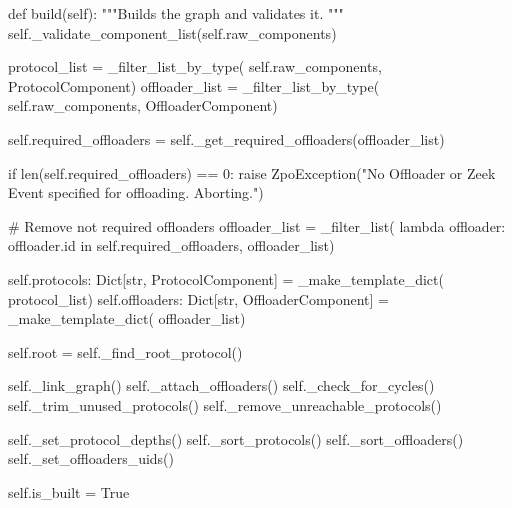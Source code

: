     def build(self):
        """Builds the graph and validates it.
        """
        self._validate_component_list(self.raw_components)

        protocol_list = _filter_list_by_type(
            self.raw_components, ProtocolComponent)
        offloader_list = _filter_list_by_type(
            self.raw_components, OffloaderComponent)

        self.required_offloaders = self._get_required_offloaders(offloader_list)

        if len(self.required_offloaders) == 0:
            raise ZpoException("No Offloader or Zeek Event specified for offloading. Aborting.")

        # Remove not required offloaders
        offloader_list = _filter_list(
            lambda offloader: offloader.id in self.required_offloaders, offloader_list)

        self.protocols: Dict[str, ProtocolComponent] = _make_template_dict(
            protocol_list)
        self.offloaders: Dict[str, OffloaderComponent] = _make_template_dict(
            offloader_list)

        self.root = self._find_root_protocol()

        self._link_graph()
        self._attach_offloaders()
        self._check_for_cycles()
        self._trim_unused_protocols()
        self._remove_unreachable_protocols()

        self._set_protocol_depths()
        self._sort_protocols()
        self._sort_offloaders()
        self._set_offloaders_uids()

        self.is_built = True